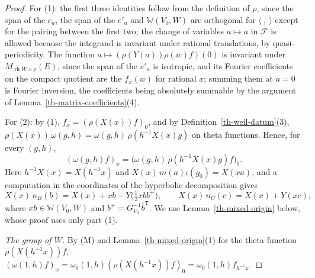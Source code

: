 \begin{proof}
For (1): the first three identities follow from the definition of $\rho$, since
the span of the $e_a$, the span of the $e'_a$ and $\mathbb W(V_0,W)$ are
orthogonal for $\langle\ ,\ \rangle$ except for the pairing between the first
two; the change of variables $a\mapsto a$ in $\mathcal F$ is allowed because the
integrand is invariant under rational translations, by quasi-periodicity. The
function $a\mapsto(\rho(Y(a))\rho(w)f)(0)$ is invariant under
$M_{\operatorname{rk}W\times\rho}(E)$, since the span of the $e'_a$ is isotropic,
and its Fourier coefficients on the compact quotient are the $f_x(w)$ for
rational $x$; summing them at $a=0$ is Fourier inversion, the coefficients being
absolutely summable by the argument of Lemma~\ref{th-matrix-coefficients}(4).

For (2): by (1), $f_x=(\rho(X(x))f)_0$, and by
Definition~\ref{th-weil-datum}(3),
$\rho(X(x))\,\omega(g,h)=\omega(g,h)\,\rho(h^{-1}X(x)g)$ on theta functions.
Hence, for every $(g,h)$,
\[
(\omega(g,h)f)_x=\bigl(\omega(g,h)\,\rho(h^{-1}X(x)g)f\bigr)_0 .\tag{M}
\]
Here $h^{-1}X(x)=X(h^{-1}x)$ and $X(x)\,m(a)\iota(g_0)=X(xa)$, and a
computation in the coordinates of the hyperbolic decomposition gives
\[
X(x)\,n_B(b)=X(x)+xb-Y\bigl(\tfrac12xbb^+\bigr),\qquad X(x)\,n_C(c)=X(x)+Y(xc),
\]
where $xb\in\mathbb W(V_0,W)$ and $b^+=G_{V_0}^{-1}\bar b^{\mathsf T}$. We use
Lemma~\ref{th-mixed-origin} below, whose proof uses only part (1).

\emph{The group of $W$.} By (M) and Lemma~\ref{th-mixed-origin}(1) for the
theta function $\rho(X(h^{-1}x))f$,
$(\omega(1,h)f)_x=\omega_0(1,h)(\rho(X(h^{-1}x))f)_0=\omega_0(1,h)f_{h^{-1}x}$.


\end{proof}

